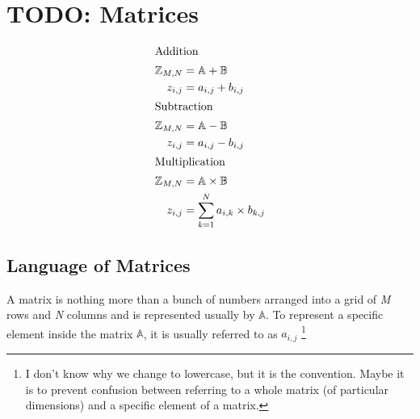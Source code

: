 \chapter{TODO: Matrices}
\label{chap:Matrices}

\begin{align}
  \intertext{Addition}
  \mathbb{Z}_{M,N} & = \mathbb{A} + \mathbb{B} \nonumber \\
         {z}_{i,j} & = {a}_{i,j} + {b}_{i,j} \\
  \intertext{Subtraction}
  \mathbb{Z}_{M,N} & = \mathbb{A} - \mathbb{B} \nonumber \\
         {z}_{i,j} & = {a}_{i,j} - {b}_{i,j} \\
  \intertext{Multiplication}
  \mathbb{Z}_{M,N} & = \mathbb{A} \times \mathbb{B} \nonumber \\
         {z}_{i,j} & = \sum_{k=1}^{N} {a}_{i,k} \times {b}_{k,j}
\end{align}

\section{Language of Matrices}
\label{sec:LanguageOfMatrices}
A matrix is nothing more than a bunch of numbers arranged into a grid of
\emph{M} rows and \emph{N} columns and is represented usually by $\mathbb{A}$.
To represent a specific element inside the matrix $\mathbb{A}$, it is usually
referred to as $a_{i,j}$ \footnote{I don't know why we change to lowercase, but
it is the convention. Maybe it is to prevent confusion between referring to a
whole matrix (of particular dimensions) and a specific element of a matrix.}

